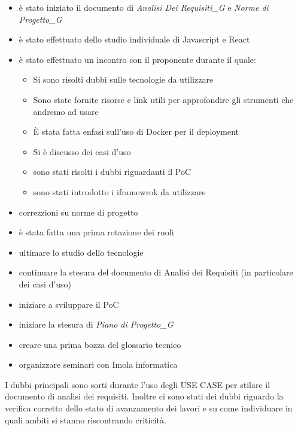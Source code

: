 \begin{itemize}
    \item è stato iniziato il documento di \textit{Analisi Dei Requisiti_G} e \textit{Norme di Progetto_G}
    \item è stato effettuato dello studio individuale di Javascript e React
    \item è stato effettuato un incontro con il proponente durante il quale:
    \begin{itemize}
        \item Si sono risolti dubbi sulle tecnologie da utilizzare
        \item Sono state fornite risorse e link utili per approfondire gli strumenti che andremo ad usare
        \item È stata fatta enfasi sull'uso di Docker per il deployment
        \item Si è discusso dei casi d'uso
        \item sono stati risolti i dubbi riguardanti il PoC
        \item sono stati introdotto i iframewrok da utilizzare
    \end{itemize}
    \item correzzioni su norme di progetto
    \item è stata fatta una prima rotazione dei ruoli
\end{itemize}

\begin{itemize}
    \item ultimare lo studio dello tecnologie
    \item continuare la stesura del documento di Analisi dei Requisiti (in particolare dei casi d'uso)
    \item iniziare a sviluppare il PoC
    \item iniziare la stesura di \textit{Piano di Progetto_G}
    \item creare una prima bozza del glossario tecnico
    \item organizzare seminari con Imola informatica
\end{itemize}


I dubbi principali sono sorti durante l'uso degli USE CASE per stilare il documento di analisi dei requisiti. Inoltre ci sono stati dei dubbi riguardo la verifica corretto dello stato di avanzamento dei lavori e su come individuare in quali ambiti si stanno riscontrando criticità. 

